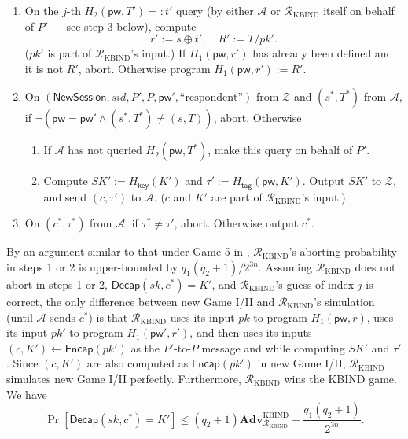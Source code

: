 \documentclass{article}
\theoremstyle{plain}
\theoremstyle{definition}
\theoremstyle{remark}
\newcommand{\adv}{\mathcal{A}}
\newcommand{\env}{\mathcal{Z}}
\newcommand{\red}{\mathcal{R}}
\newcommand{\Adv}{\mathbf{Adv}}
\newcommand{\Encap}{\mathsf{Encap}}
\newcommand{\Decap}{\mathsf{Decap}}
\newcommand{\Hkey}{H_\mathsf{key}}
\newcommand{\Htag}{H_\mathsf{tag}}
\newcommand{\pw}{\mathsf{pw}}
\newcommand{\NewSession}{\mathsf{NewSession}}
\begin{document}
\begin{itemize}
\begin{itemize}
\begin{enumerate}
                  When $\adv$ makes an $H_2(\pw,T) =: t$ query, compute
                  \[
                  r := s \oplus t, \quad R := T/pk.
                  \]
                  ($pk$ is part of $\red_\mathrm{KBIND}$'s input.) If $H_1(\pw,r)$ has already been defined and it is not $R$, abort. Otherwise program $H_1(\pw,r) := R$.
              \item On the $j$-th $H_2(\pw,T') =: t'$ query (by either $\adv$ or $\red_\mathrm{KBIND}$ itself on behalf of $P'$ --- see step 3 below), compute
                  \[
                  r' := s \oplus t', \quad R' := T/pk'.
                  \]
                  ($pk'$ is part of $\red_\mathrm{KBIND}$'s input.) If $H_1(\pw,r')$ has already been defined and it is not $R'$, abort. Otherwise program $H_1(\pw,r') := R'$.
              \item On $(\NewSession, sid, P', P, \pw', \text{``respondent''})$ from $\env$ and $(s^*,T^*)$ from $\adv$, if $\neg(\pw = \pw' \land (s^*,T^*) \neq (s,T))$, abort. Otherwise
                  \begin{enumerate}
                    \item If $\adv$ has not queried $H_2(\pw,T^*)$, make this query on behalf of $P'$.
                    \item Compute $SK':= \Hkey(K')$ and $\tau' := \Htag(\pw,K')$. Output $SK'$ to $\env$, and send $(c,\tau')$ to $\adv$. ($c$ and $K'$ are part of $\red_\mathrm{KBIND}$'s input.)
                  \end{enumerate}
              \item On $(c^*,\tau^*)$ from $\adv$, if $\tau^* \neq \tau'$, abort. Otherwise output $c^*$.
            \end{enumerate}
      \end{itemize}
      By an argument similar to that under Game 5 in , $\red_\text{KBIND}$'s aborting probability in steps 1 or 2 is upper-bounded by $q_1(q_2+1)/2^{3n}$. Assuming $\red_\text{KBIND}$ does not abort in steps 1 or 2, $\Decap(sk,c^*) = K'$, and $\red_\text{KBIND}$'s guess of index $j$ is correct, the only difference between new Game I/II and $\red_\text{KBIND}$'s simulation (until $\adv$ sends $c^*$) is that $\red_\text{KBIND}$ uses its input $pk$ to program $H_1(\pw,r)$, uses its input $pk'$ to program $H_1(\pw',r')$, and then uses its inputs $(c,K') \gets \Encap(pk')$ as the $P'$-to-$P$ message and while computing $SK'$ and $\tau'$. Since $(c,K')$ are also computed as $\Encap(pk')$ in new Game I/II, $\red_\text{KBIND}$ simulates new Game I/II perfectly. Furthermore, $\red_\text{KBIND}$ wins the KBIND game. We have
      \[
      \Pr[\Decap(sk,c^*) = K'] \leq (q_2+1)\Adv_{\red_\text{KBIND}}^\text{KBIND} + \frac{q_1(q_2+1)}{2^{3n}}.
      \]
\end{itemize}
\end{document}
